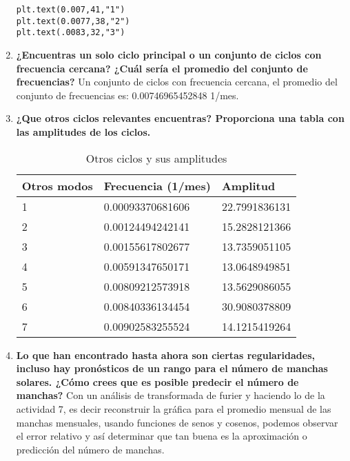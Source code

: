 \documentclass[12pt]{article}
\begin{document}
\begin{doublespace}
\begin{enumerate}
\begin{verbatim}
plt.text(0.007,41,"1")
plt.text(0.0077,38,"2")
plt.text(.0083,32,"3")
\end{verbatim}

\item \textbf{¿Encuentras un solo ciclo principal o un conjunto de ciclos con frecuencia cercana? ¿Cuál sería el promedio del conjunto de frecuencias?} Un conjunto de ciclos con frecuencia cercana, el promedio del conjunto de frecuencias es: 0.00746965452848 1/mes.

\pagebreak

\item \textbf{¿Que otros ciclos relevantes encuentras? Proporciona una tabla con las amplitudes de los ciclos.}

\begin{table}[ht!]
\centering
\caption{Otros ciclos y sus amplitudes}
\label{my-label}
\begin{tabular}{|l|l|l|}
\hline
Otros modos & Frecuencia (1/mes) & Amplitud      \\ \hline
1           & 0.00093370681606   & 22.7991836131 \\ \hline
2           & 0.00124494242141   & 15.2828121366 \\ \hline
3           & 0.00155617802677   & 13.7359051105 \\ \hline
4           & 0.00591347650171   & 13.0648949851 \\ \hline
5           & 0.00809212573918   & 13.5629086055 \\ \hline
6           & 0.00840336134454   & 30.9080378809 \\ \hline
7           & 0.00902583255524   & 14.1215419264 \\ \hline
\end{tabular}
\end{table}

\item \textbf{Lo que han encontrado hasta ahora son ciertas regularidades, incluso hay pronósticos de un rango para el número de manchas solares. ¿Cómo crees que es posible predecir el número de manchas?} Con un análisis de transformada de furier y haciendo lo de la actividad 7, es decir reconstruir la gráfica para el promedio mensual de las manchas mensuales, usando funciones de senos y cosenos, podemos observar el error relativo y así determinar que tan buena es la aproximación o predicción del número de manchas.

\end{enumerate}
 
    
     
    

 

\end{doublespace}
\end{document}
